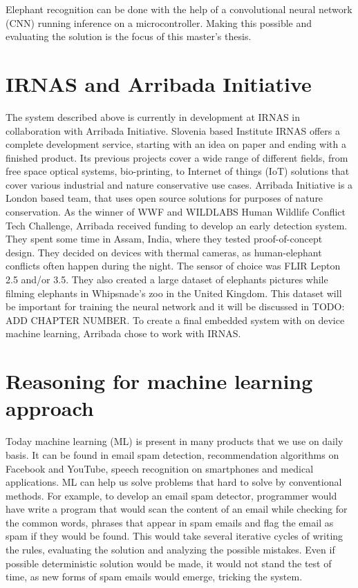 Elephant recognition can be done with the help of a convolutional neural network (CNN) running inference on a microcontroller. 
Making this possible and evaluating the solution is the focus of this master's thesis.


\section{ IRNAS and Arribada Initiative}

The system described above is currently in development at IRNAS in collaboration with Arribada Initiative.
Slovenia based Institute IRNAS offers a complete development service, starting with an idea on paper and ending with a finished product. 
Its previous projects cover a wide range of different fields, from free space optical systems, bio-printing, to Internet of things (IoT) solutions that cover various industrial and nature conservative use cases.
Arribada Initiative is a London based team, that uses open source solutions for purposes of nature conservation.
As the winner of WWF and WILDLABS Human Wildlife Conflict Tech Challenge\cite{wildlabs-winners}, Arribada received funding to develop an early detection system.
They spent some time in Assam, India, where they tested proof-of-concept design\cite{arribada-assam}.
They decided on devices with thermal cameras, as human-elephant conflicts often happen during the night.
The sensor of choice was FLIR Lepton 2.5 and/or 3.5.
They also created a large dataset of elephants pictures while filming elephants in Whipsnade's zoo in the United Kingdom. 
This dataset will be important for training the neural network and it will be discussed in TODO: ADD CHAPTER NUMBER.
To create a final embedded system with on device machine learning, Arribada chose to work with IRNAS.


\section{ Reasoning for machine learning approach}

Today machine learning (ML) is present in many products that we use on daily basis.
It can be found in email spam detection, recommendation algorithms on Facebook and YouTube, speech recognition on smartphones and medical applications.
ML can help us solve problems that hard to solve by conventional methods.
For example, to develop an email spam detector, programmer would have write a program that would scan the content of an email while checking for the common words, phrases that appear in spam emails and flag the email as spam if they would be found.
This would take several iterative cycles of writing the rules, evaluating the solution and analyzing the possible mistakes. 
Even if possible deterministic solution would be made, it would not stand the test of time, as new forms of spam emails would emerge, tricking the system.

